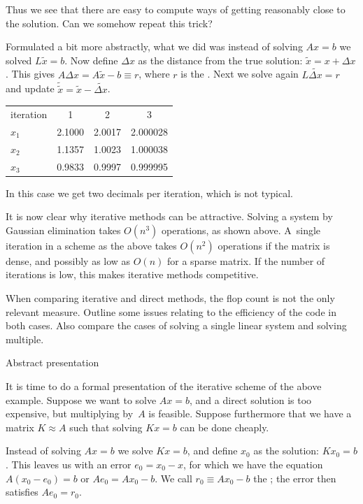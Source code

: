 Thus we see that there are easy to compute ways of getting
reasonably close to the solution. Can we somehow repeat this trick?

Formulated a bit more abstractly, what we did was instead of solving
$Ax=b$ we solved $L\tilde x=b$. Now define $\Delta x$ as the distance
from the true solution: $\tilde x=x+\Delta x$. This gives $A\Delta
x=A\tilde x-b\equiv r$, where $r$ is the . Next
we solve again $L\widetilde{\Delta x}=r$ and update $\tilde{\tilde
  x}=\tilde x-\widetilde{\Delta x}$.

  \begin{tabular}{|l|ccc|}
    \hline
    iteration&1&2&3\\
    $x_1$&2.1000&2.0017&2.000028\\
    $x_2$&1.1357&1.0023&1.000038\\
    $x_3$&0.9833&0.9997&0.999995\\ \hline
  \end{tabular}

In this case we get two decimals per iteration, which is not typical.

It is now clear why iterative methods can be attractive. 
Solving a system by Gaussian elimination takes $O(n^3)$ operations, as
shown above. A~single iteration in a scheme as the above takes
$O(n^2)$ operations if the matrix is dense, and possibly as low as
$O(n)$ for a sparse matrix. If the number of iterations is low, this makes
iterative methods competitive.

\begin{exercise}
  When comparing iterative and direct methods, the flop count is not
  the only relevant measure. Outline some issues relating to the
  efficiency of the code in both cases. Also compare the cases of
  solving a single linear system and solving multiple.
\end{exercise}

 {Abstract presentation}
\label{sec:stationary}

It is time to do a formal presentation of the iterative scheme of the
above example. Suppose we want to solve $Ax=b$, and a direct solution
is too expensive, but multiplying by~$A$ is feasible. Suppose
furthermore that we have a matrix $K\approx A$ such that solving $Kx=b$
can be done cheaply.

Instead of solving $Ax=b$ we solve $Kx=b$, and define $x_0$ as the
solution: $Kx_0=b$. This leaves us with an error $e_0=x_0-x$, for
which we have the equation $A(x_0-e_0)=b$ or $Ae_0=Ax_0-b$. We call
$r_0\equiv Ax_0-b$ the ; the error then satisfies
$Ae_0=r_0$.

